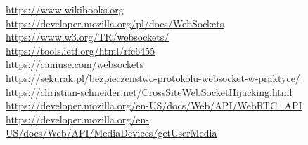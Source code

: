 \documentclass{article}
\begin{document}
\url{https://www.wikibooks.org}\\
\url{https://developer.mozilla.org/pl/docs/WebSockets}\\
\url{https://www.w3.org/TR/websockets/}\\
\url{https://tools.ietf.org/html/rfc6455}\\
\url{https://caniuse.com/websockets}\\
\url{https://sekurak.pl/bezpieczenstwo-protokolu-websocket-w-praktyce/}\\
\url{https://christian-schneider.net/CrossSiteWebSocketHijacking.html}\\
\url{https://developer.mozilla.org/en-US/docs/Web/API/WebRTC_API}\\
\url{https://developer.mozilla.org/en-US/docs/Web/API/MediaDevices/getUserMedia}
\end{document}

